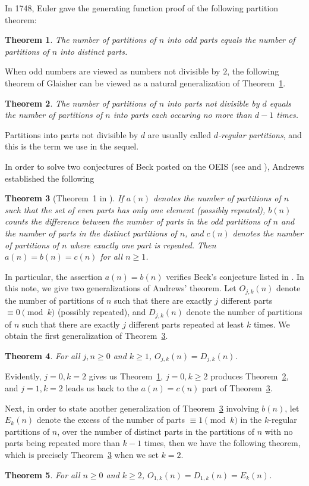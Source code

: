 \documentclass[12pt]{amsart}
\numberwithin{equation}{section}
\theoremstyle{plain}
\newtheorem{theorem}{Theorem}[section]
\theoremstyle{definition}
\begin{document}
In 1748, Euler \cite{Eul} gave the generating function proof of the following partition theorem:
\begin{theorem}\label{Euler}
The number of partitions of $n$ into odd parts equals the number of partitions of $n$ into distinct parts.
\end{theorem}
When odd numbers are viewed as numbers not divisible by $2$, the following theorem of Glaisher \cite[Corollary~1.3]{Andr1} can be viewed as a natural generalization of Theorem~\ref{Euler}.
\begin{theorem}\label{Glaisher}
The number of partitions of $n$ into parts not divisible by $d$ equals the number of partitions of $n$ into parts each occuring no more than $d-1$ times.
\end{theorem}
Partitions into parts not divisible by $d$ are usually called \emph{$d$-regular partitions}, and this is the term we use in the sequel.

In order to solve two conjectures of Beck posted on the OEIS (see \cite{OEIS1} and \cite{OEIS2}), Andrews \cite{Andr2} established the following
\begin{theorem}[Theorem~1 in \cite{Andr2}]\label{Andrews}
If $a(n)$ denotes the number of partitions of $n$ such that the set of even parts has only one element (possibly repeated), $b(n)$ counts the difference between the number of parts in the odd partitions of $n$ and the number of parts in the distinct partitions of $n$, and $c(n)$ denotes the number of partitions of $n$ where exactly one part is repeated. Then $a(n)=b(n)=c(n)$ for all $n\geq1$.
\end{theorem}
In particular, the assertion $a(n)=b(n)$ verifies Beck's conjecture listed in \cite{OEIS1}.
In this note, we give two generalizations of Andrews' theorem. Let $O_{j,k}(n)$ denote the number of partitions of $n$ such that there are exactly $j$ different parts $\equiv0\pmod{k}$ (possibly repeated), and $D_{j,k}(n)$ denote the number of partitions of $n$ such that there are exactly $j$ different parts repeated at least $k$ times. We obtain the first generalization of Theorem~\ref{Andrews}.
\begin{theorem}\label{jk analog}
For all $j, n\geq0$ and $k\geq1$, $O_{j,k}(n)=D_{j,k}(n)$.
\end{theorem}
Evidently, $j=0,k=2$ gives us Theorem~\ref{Euler}, $j=0, k\geq 2$ produces Theorem~\ref{Glaisher}, and $j=1, k=2$ leads us back to the $a(n)=c(n)$ part of Theorem~\ref{Andrews}.

Next, in order to state another generalization of Theorem~\ref{Andrews} involving $b(n)$, let $E_{k}(n)$ denote the excess of the number of parts $\equiv1\pmod{k}$ in the $k$-regular partitions of $n$, over the number of distinct parts in the partitions of $n$ with no parts being repeated more than $k-1$ times, then we have the following theorem, which is precisely Theorem~\ref{Andrews} when we set $k=2$.
\begin{theorem}\label{k analog:a=b=c}
For all $n\geq0$ and $k\geq2$, $O_{1,k}(n)=D_{1,k}(n)=E_{k}(n)$.
\end{theorem}
\end{document}
